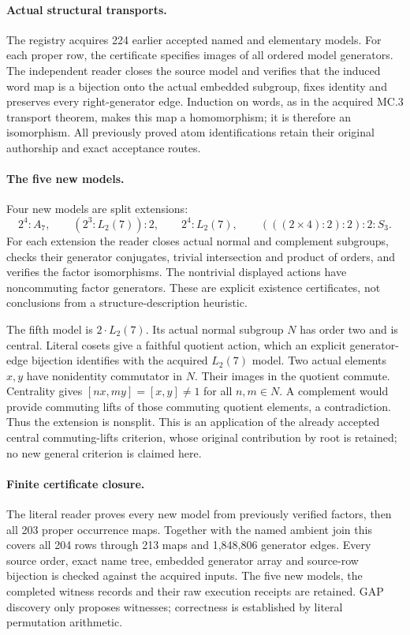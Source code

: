 \documentclass[11pt]{article}
\begin{document}
\paragraph{Actual structural transports.}
The registry acquires 224 earlier accepted named and elementary models. For
each proper row, the certificate specifies images of all ordered model
generators. The independent reader closes the source model and verifies
that the induced word map is a bijection onto the actual embedded subgroup,
fixes identity and preserves every right-generator edge. Induction on words,
as in the acquired MC.3 transport theorem, makes this map a homomorphism;
it is therefore an isomorphism. All previously proved atom identifications
retain their original authorship and exact acceptance routes.

\newpage
\paragraph{The five new models.}
Four new models are split extensions:
\[
 2^4:A_7,\qquad (2^3:L_2(7)):2,\qquad 2^4:L_2(7),\qquad
 (((2\times4):2):2):2:S_3.
\]
For each extension the reader closes actual normal and complement subgroups,
checks their generator conjugates, trivial intersection and product of
orders, and verifies the factor isomorphisms. The nontrivial displayed
actions have noncommuting factor generators. These are explicit existence
certificates, not conclusions from a structure-description heuristic.

The fifth model is $2\mathbin{\cdot}L_2(7)$. Its actual normal subgroup
$N$ has order two and is central. Literal cosets give a faithful quotient
action, which an explicit generator-edge bijection identifies with the
acquired $L_2(7)$ model. Two actual elements $x,y$ have nonidentity commutator
in $N$. Their images in the quotient commute. Centrality gives
$[nx,my]=[x,y]\ne1$ for all $n,m\in N$. A complement would provide commuting
lifts of those commuting quotient elements, a contradiction. Thus the
extension is nonsplit. This is an application of the already accepted
central commuting-lifts criterion, whose original contribution by root is
retained; no new general criterion is claimed here.

\paragraph{Finite certificate closure.}
The literal reader proves every new model from previously verified factors,
then all 203 proper occurrence maps. Together with the named ambient join
this covers all 204 rows through 213 maps and 1,848,806 generator edges.
Every source order, exact name tree, embedded
generator array and source-row bijection is checked against the acquired
inputs. The five new models, the completed witness records and their raw
execution receipts are retained. GAP discovery only proposes witnesses;
correctness is established by literal permutation arithmetic.
\end{document}
